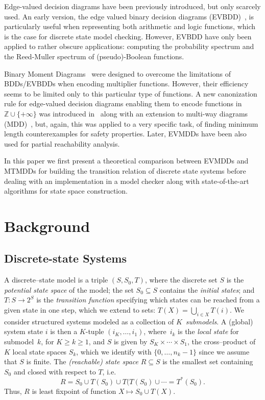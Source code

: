\documentclass[a4paper,oneside,11pt,pdftex]{llncs}
\newcommand{\Z}{\mathbb{Z}}
\begin{document}
Edge-valued decision diagrams have been previously 
introduced, but only scarcely used. An early version, the edge valued binary 
decision diagrams (EVBDD)~\cite{Lai1992,Lai1996}, is particularly useful 
when representing both arithmetic and logic functions, which is the case 
for discrete state model checking. However, EVBDD have only been applied 
to rather obscure applications: computing the probability spectrum and 
the Reed-Muller spectrum of (pseudo)-Boolean functions. 

Binary Moment Diagrams~\cite{Bryant1994} were designed to overcome the 
limitations of BDDs/EVBDDs when encoding multiplier functions.
However, their efficiency seems to be limited only to this particular 
type of functions.
%
A new canonization rule for edge-valued decision diagrams enabling them
to encode functions in $\Z \cup \{+\infty\}$ was introduced in~\cite{FMCAD2002}
along with an extension to multi-way diagrams (MDD)~\cite{Kam1998}, but, again,
this was applied to a very specific task, of finding minimum length counterexamples
for safety properties. Later, EVMDDs have been also used for partial reachability analysis.

In this paper we first present a theoretical comparison between EVMDDs and MTMDDs
for building the transition relation of discrete state systems
before dealing with an implementation in a model checker
along with state-of-the-art algorithms for state space construction.

\section{Background}

\subsection{Discrete-state Systems}\label{sec:DSS}

A discrete--state model is a triple $(S,S_0,T)$, where
the discrete set $S$ is the \emph{potential state space} of the model;
the set $S_0\subseteq S$ contains the \emph{initial states};
and $T : S\rightarrow 2^{S}$ is the \emph{transition function}
specifying which states can be reached from a given state in one step, 
which we extend to sets: $T(X) = \bigcup_{i\in X}T(i)$.
We consider structured systems modeled as a collection of $K$~\emph{submodels}.
A (global) system state $i$ is then a $K$-tuple $(i_{K},\ldots,i_{1})$,
where~$i_{k}$ is the \emph{local state} for submodel~$k$,
for $K \!\geq\! k\! \geq\! 1$, and
$S$ is given by $ S_K \times \cdots \times  S_{1}$,
the cross--product of $K$ local state spaces $ S_k$,
which we identify with $\{0,\ldots,n_k\!-\!1\}$ since
we assume that $S$ is finite.
The \emph{(reachable) state space} $R \subseteq S$ is the
smallest set containing $S_0$ and closed with respect to $T$,
i.e.
$$R = S_0 \cup T(S_0) \cup
T(T(S_0) \cup \cdots = T^{\ast}(S_0).$$
Thus, $R$ is least fixpoint of function $X \mapsto S_0 \cup T(X)$.
\end{document}
